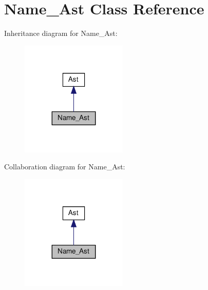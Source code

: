 \hypertarget{className__Ast}{}\section{Name\+\_\+\+Ast Class Reference}
\label{className__Ast}


Inheritance diagram for Name\+\_\+\+Ast\+:
\nopagebreak
\begin{figure}[H]
\begin{center}
\leavevmode
\includegraphics[width=143pt]{className__Ast__inherit__graph}
\end{center}
\end{figure}


Collaboration diagram for Name\+\_\+\+Ast\+:
\nopagebreak
\begin{figure}[H]
\begin{center}
\leavevmode
\includegraphics[width=143pt]{className__Ast__coll__graph}
\end{center}
\end{figure}
